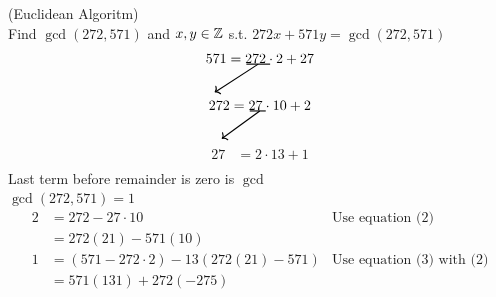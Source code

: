 \begin{algorithm}(Euclidean Algoritm)\\
    Find \(\gcd(272,571)\) and \(x,y\in\mathbb{Z}\) s.t. \(272x+571y=\gcd(272,571)\)
    \begin{equation}
        \begin{aligned}
            571 & = 272 \cdot 2 + 27 \\
            & \begin{tikzpicture}[overlay, remember picture]
               \draw [->, thick] (0.8,0.5) -- (-0.3,-0.2);
                \draw [thick] (1.1,0.5) -- (0.5,0.5);
                \end{tikzpicture} \\
        \end{aligned}
    \end{equation}
    \begin{equation}
        \begin{aligned}
            272 & = 27 \cdot 10 + 2 \\
                & \begin{tikzpicture}[overlay, remember picture]
                    \draw [->, thick] (0.75,0.5) -- (-0.2,-0.2);
                    \draw [thick] (0.9,0.5) -- (0.5,0.5);
                    \end{tikzpicture} \\
        \end{aligned}
    \end{equation}
    \begin{equation}
        \begin{aligned}
            27 & = 2 \cdot 13 + 1 \\
        \end{aligned}
    \end{equation}
    Last term before remainder is zero is \(\gcd\)\\
    \(\gcd\left( 272,571 \right)=1\)
    \begin{align*}
        2&=272-27\cdot10 &\text{Use equation (2)}\\
         &=272(21)-571(10)\\
        1&=(571-272\cdot2)-13(272(21)-571) &\text{Use equation (3) with (2)}\\
         &=571(131)+272(-275)
    \end{align*}
\end{algorithm}
